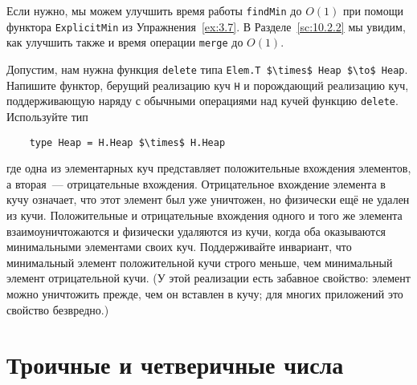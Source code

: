 \begin{frame}[fragile]{}
Если нужно, мы можем улучшить время работы \lstinline!findMin! до
$O(1)$ при помощи функтора \lstinline!ExplicitMin! из
Упражнения~\ref{ex:3.7}. В Разделе~\ref{sc:10.2.2} мы увидим, как
улучшить также и время операции \lstinline!merge! до $O(1)$.

\begin{exercise}\label{ex:9.16}
  Допустим, нам нужна функция \lstinline!delete! типа
  \lstinline!Elem.T $\times$ Heap $\to$ Heap!.
  Напишите функтор, берущий реализацию куч \lstinline!H! и порождающий
  реализацию куч, поддерживающую наряду с обычными операциями над
  кучей функцию \lstinline!delete!. Используйте тип
  \begin{lstlisting}
    type Heap = H.Heap $\times$ H.Heap
  \end{lstlisting}
  где одна из элементарных куч представляет положительные вхождения
  элементов, а вторая~--- отрицательные вхождения. Отрицательное
  вхождение элемента в кучу означает, что этот элемент был уже
  уничтожен, но физически ещё не удален из кучи.  Положительные и
  отрицательные вхождения одного и того же элемента
  взаимоуничтожаются и физически удаляются из кучи, когда оба
  оказываются минимальными элементами своих куч.  Поддерживайте
  инвариант, что минимальный элемент положительной кучи строго меньше,
  чем минимальный элемент отрицательной кучи. (У этой реализации есть
  забавное свойство: элемент можно уничтожить прежде, чем он
  вставлен в кучу; для многих приложений это свойство безвредно.)
\end{exercise}

\end{frame}

\section{Троичные и четверичные числа}
\label{sc:9.4}


